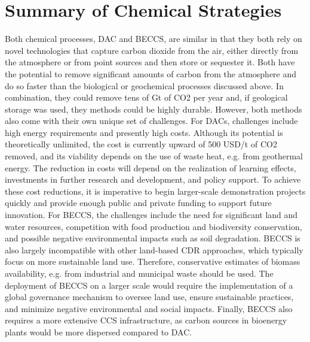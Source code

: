 \section{Summary of Chemical Strategies}
Both chemical processes, DAC and BECCS, are similar in that they both rely on novel technologies that capture carbon dioxide from the air, either directly from the atmosphere or from point sources and then store or sequester it. Both have the potential to remove significant amounts of carbon from the atmosphere and do so faster than the biological or geochemical processes discussed above. In combination, they could remove tens of Gt of CO2 per year and, if geological storage was used, they methods could be highly durable.
However, both methods also come with their own unique set of challenges. For DACs, challenges include high energy requirements and presently high costs. Although its potential is theoretically unlimited, the cost is currently upward of 500 USD/t of CO2 removed, and its viability depends on the use of waste heat, e.g. from geothermal energy. The reduction in costs will depend on the realization of learning effects, investments in further research and development, and policy support. To achieve these cost reductions, it is imperative to begin larger-scale demonstration projects quickly and provide enough public and private funding to support future innovation.
For BECCS, the challenges include the need for significant land and water resources, competition with food production and biodiversity conservation, and possible negative environmental impacts such as soil degradation. BECCS is also largely incompatible with other land-based CDR approaches, which typically focus on more sustainable land use. Therefore, conservative estimates of biomass availability, e.g. from industrial and municipal waste should be used. The deployment of BECCS on a larger scale would require the implementation of a global governance mechanism to oversee land use, ensure sustainable practices, and minimize negative environmental and social impacts. Finally, BECCS also requires a more extensive CCS infrastructure, as carbon sources in bioenergy plants would be more dispersed compared to DAC.
